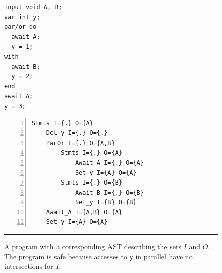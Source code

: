 \documentclass{sigplanconf}
\newcommand{\code}[1] {{\small{\texttt{#1}}}}
\newcommand{\1}{\;}
\newcommand{\2}{\;\;}
\newcommand{\3}{\;\;\;}
\newcommand{\5}{\;\;\;\;\;}
\begin{document}
\begin{figure}[h]
\begin{minipage}[t]{0.45\linewidth}
\begin{lstlisting}
input void A, B;
var int y;
par/or do
  await A;
  y = 1;
with
  await B;
  y = 2;
end
await A;
y = 3;
\end{lstlisting}
\end{minipage}
%
%
\begin{minipage}[t]{0.55\linewidth}
\begin{lstlisting}[numbers=left,xleftmargin=2.5em]
Stmts I={.} O={A}
    Dcl_y I={.} O={.}
    ParOr I={.} O={A,B}
        Stmts I={.} O={A}
            Await_A I={.} O={A}
            Set_y I={A} O={A}
        Stmts I={.} O={B}
            Await_B I={.} O={B}
            Set_y I={B} O={B}
    Await_A I={A,B} O={A}
    Set_y I={A} O={A}
\end{lstlisting}
\end{minipage}
%
\rule{14cm}{0.37pt}
\caption{ A program with a corresponding AST describing the sets $I$ and $O$.
The program is safe because accesses to \code{y} in parallel have no 
intersections for $I$.
\label{lst.impl.ast}
}
\end{figure}

\end{document}
